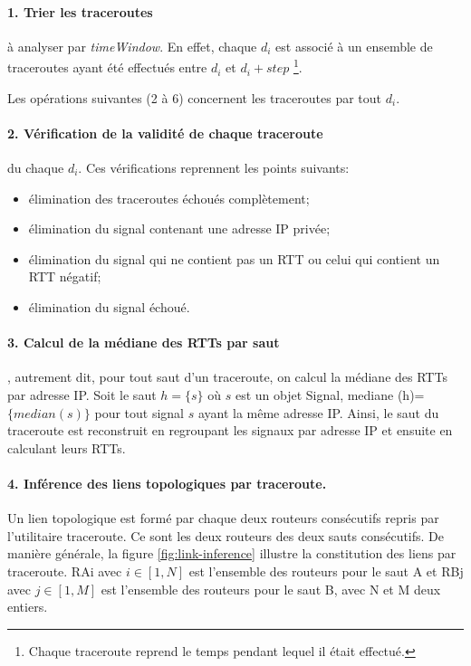 \paragraph{1. Trier les traceroutes } à analyser par \textit{timeWindow}. En effet, chaque $d_i$ est associé à un ensemble de traceroutes ayant été effectués entre $d_i$ et $d_i + step$ \footnote{Chaque traceroute reprend le temps pendant lequel il était effectué.}. 

Les opérations suivantes (2 à 6) concernent  les traceroutes par tout $d_i$.  

\paragraph{2. Vérification de la validité de chaque traceroute } du chaque $d_i$. Ces vérifications reprennent les points suivants:
\begin{itemize}
	\item élimination des traceroutes échoués complètement;
	\item élimination du signal contenant une adresse IP privée;
	\item élimination du signal qui ne contient pas un RTT ou celui qui contient un RTT négatif;
	\item  élimination du signal échoué.
\end{itemize}

\paragraph{3. Calcul de la médiane des RTTs par saut}, autrement dit, pour tout saut d'un traceroute,  on calcul la médiane des RTTs par adresse IP. Soit le saut $h =\{s \}$ où $s$ est un objet Signal, mediane (h)= $\{ median(s)\}$  pour tout signal $s$ ayant la même adresse IP. Ainsi, le saut du traceroute est reconstruit en regroupant les signaux par adresse IP et ensuite en calculant leurs RTTs. 


\paragraph{4. Inférence des liens topologiques par traceroute.} Un lien topologique est formé par chaque deux routeurs consécutifs repris par l'utilitaire traceroute. Ce sont les deux routeurs des deux sauts consécutifs. De manière générale, la figure \ref{fig:link-inference} illustre la constitution des liens par traceroute. RAi avec $i \in [1,N]$ est l'ensemble des routeurs pour le saut A et RBj avec $j \in [1,M]$ est l'ensemble des routeurs pour le saut B, avec N et M deux entiers.




